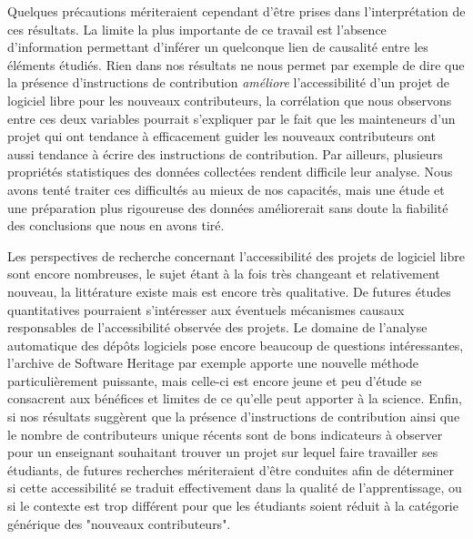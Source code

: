 Quelques précautions mériteraient cependant d'être prises dans l'interprétation de ces résultats. La limite la
plus importante de ce travail est l'absence d'information permettant d'inférer un quelconque lien de causalité
entre les éléments étudiés. Rien dans nos résultats ne nous permet par exemple de dire que la présence
d'instructions de contribution \emph{améliore} l'accessibilité d'un projet de logiciel libre pour les nouveaux
contributeurs, la corrélation que nous observons entre ces deux variables pourrait s'expliquer par le fait que
les mainteneurs d'un projet qui ont tendance à efficacement guider les nouveaux contributeurs ont aussi
tendance à écrire des instructions de contribution. Par ailleurs, plusieurs propriétés statistiques des
données collectées rendent difficile leur analyse. Nous avons tenté traiter ces difficultés au mieux de nos
capacités, mais une étude et une préparation plus rigoureuse des données améliorerait sans doute la fiabilité
des conclusions que nous en avons tiré.

Les perspectives de recherche concernant l'accessibilité des projets de logiciel libre sont encore nombreuses,
le sujet étant à la fois très changeant et relativement nouveau, la littérature existe mais est encore très
qualitative. De futures études quantitatives pourraient s'intéresser aux éventuels mécanismes causaux
responsables de l'accessibilité observée des projets. Le domaine de l'analyse automatique des dépôts logiciels
pose encore beaucoup de questions intéressantes, l'archive de Software Heritage par exemple apporte une
nouvelle méthode particulièrement puissante, mais celle-ci est encore jeune et peu d'étude se consacrent aux
bénéfices et limites de ce qu'elle peut apporter à la science. Enfin, si nos résultats suggèrent que la
présence d'instructions de contribution ainsi que le nombre de contributeurs unique récents sont de bons
indicateurs à observer pour un enseignant souhaitant trouver un projet sur lequel faire travailler ses
étudiants, de futures recherches mériteraient d'être conduites afin de déterminer si cette accessibilité se
traduit effectivement dans la qualité de l'apprentissage, ou si le contexte est trop différent pour que les
étudiants soient réduit à la catégorie générique des "nouveaux contributeurs".
